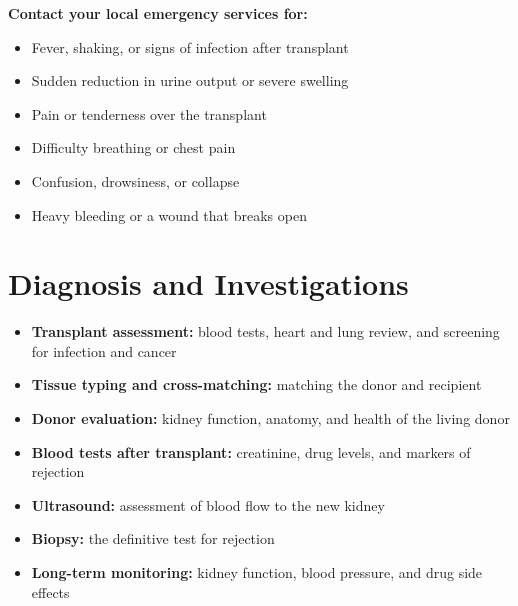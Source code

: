 \textbf{Contact your local emergency services for:}
\begin{itemize}
    \item Fever, shaking, or signs of infection after transplant
    \item Sudden reduction in urine output or severe swelling
    \item Pain or tenderness over the transplant
    \item Difficulty breathing or chest pain
    \item Confusion, drowsiness, or collapse
    \item Heavy bleeding or a wound that breaks open
\end{itemize}

\section*{Diagnosis and Investigations}
\begin{itemize}
    \item \textbf{Transplant assessment:} blood tests, heart and lung review, and screening for infection and cancer
    \item \textbf{Tissue typing and cross-matching:} matching the donor and recipient
    \item \textbf{Donor evaluation:} kidney function, anatomy, and health of the living donor
    \item \textbf{Blood tests after transplant:} creatinine, drug levels, and markers of rejection
    \item \textbf{Ultrasound:} assessment of blood flow to the new kidney
    \item \textbf{Biopsy:} the definitive test for rejection
    \item \textbf{Long-term monitoring:} kidney function, blood pressure, and drug side effects
\end{itemize}

